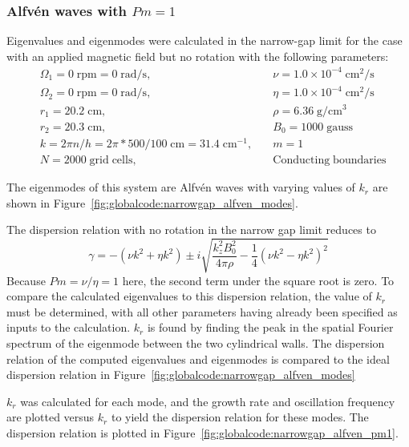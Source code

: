 \documentclass[letterpaper]{article}
\begin{document}
\subsubsection{Alfv\'en waves with $Pm=1$}

Eigenvalues and eigenmodes were calculated in the narrow-gap limit for
the case with an applied magnetic field but no rotation with the
following parameters:
\begin{align*}
&\Omega_1 = 0\;\mathrm{rpm} = 0\;\mathrm{rad/s},\quad
    &\nu = 1.0\times10^{-4}\;\mathrm{cm^2/s}
\\
&\Omega_2 = 0\;\mathrm{rpm} = 0\;\mathrm{rad/s},\quad
    &\eta = 1.0\times10^{-4}\;\mathrm{cm^2/s}
\\
&r_1 = 20.2\;\mathrm{cm},\quad &\rho = 6.36\;\mathrm{g/cm^3}
\\
&r_2 = 20.3\;\mathrm{cm},\quad &B_0 = 1000\; \mathrm{gauss}
\\
&k = 2\pi n/h = 2\pi*500/100\;\mathrm{cm} = 31.4\;\mathrm{cm^{-1}},\quad
    &m=1
\\
&N = 2000\;\mathrm{grid\;cells},\quad &\mathrm{Conducting\;boundaries}
\end{align*}

The eigenmodes of this system are Alfv\'en waves with varying values
of $k_r$ are shown in
Figure~\ref{fig:globalcode:narrowgap_alfven_modes}.

The dispersion relation with no rotation in the narrow gap limit reduces to
\begin{equation}
\gamma = -(\nu k^2 + \eta k^2) 
         \pm i\sqrt{\frac{k_z^2B_0^2}{4\pi\rho} 
                    - \frac{1}{4}\left(\nu k^2 - \eta k^2\right)^2}
\label{eqn:globalcode:alfven_wave_dr}
\end{equation}
Because $Pm=\nu/\eta=1$ here, the second term under the square root is
zero. To compare the calculated eigenvalues to this dispersion
relation, the value of $k_r$ must be determined, with all other
parameters having already been specified as inputs to the
calculation. $k_r$ is found by finding the peak in the spatial Fourier
spectrum of the eigenmode between the two cylindrical walls. The
dispersion relation of the computed eigenvalues and eigenmodes is
compared to the ideal dispersion relation in
Figure~\ref{fig:globalcode:narrowgap_alfven_modes}

$k_r$ was calculated for each mode, and the growth rate and
oscillation frequency are plotted versus $k_r$ to yield the dispersion
relation for these modes.  The dispersion relation is plotted in
Figure~\ref{fig:globalcode:narrowgap_alfven_pm1}.
\end{document}
